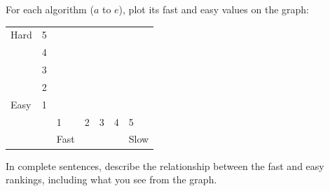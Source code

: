 \Q For each algorithm ($a$ to $e$), plot its fast and easy values on the graph:

\begin{table}[h]
\centering
\renewcommand{\arraystretch}{1.6}
\begin{tabularx}{275pt}{X C{28pt} | C{28pt} C{28pt} C{28pt} C{28pt} C{28pt}}
Hard & 5 \\
     & 4 \\
     & 3 \\
     & 2 \\
Easy & 1 \\
\hline
     & & 1    & 2 & 3 & 4 & 5    \\
     & & Fast &   &   &   & Slow \\
\end{tabularx}
\end{table}


\Q In complete sentences, describe the relationship between the fast and easy rankings, including what you see from the graph. 

\begin{answer}
\end{answer}
